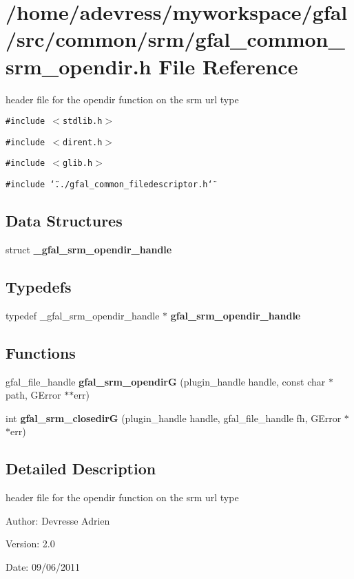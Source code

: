 \section{/home/adevress/myworkspace/gfal/src/common/srm/gfal\_\-common\_\-srm\_\-opendir.h File Reference}
\label{gfal__common__srm__opendir_8h}
header file for the opendir function on the srm url type 

{\tt \#include $<$stdlib.h$>$}\par
{\tt \#include $<$dirent.h$>$}\par
{\tt \#include $<$glib.h$>$}\par
{\tt \#include \char`\"{}../gfal\_\-common\_\-filedescriptor.h\char`\"{}}\par
\subsection*{Data Structures}
\begin{CompactItemize}
\item 
struct \textbf{\_\-gfal\_\-srm\_\-opendir\_\-handle}
\end{CompactItemize}
\subsection*{Typedefs}
\begin{CompactItemize}
\item 
typedef \_\-gfal\_\-srm\_\-opendir\_\-handle $\ast$ \textbf{gfal\_\-srm\_\-opendir\_\-handle}\label{gfal__common__srm__opendir_8h_824f5b93bbf97b9fed247ce0d6603a2c}

\end{CompactItemize}
\subsection*{Functions}
\begin{CompactItemize}
\item 
gfal\_\-file\_\-handle \textbf{gfal\_\-srm\_\-opendir\-G} (plugin\_\-handle handle, const char $\ast$path, GError $\ast$$\ast$err)\label{gfal__common__srm__opendir_8h_fd69e8b21a559da40247ce7e0b8a2cf7}

\item 
int \textbf{gfal\_\-srm\_\-closedir\-G} (plugin\_\-handle handle, gfal\_\-file\_\-handle fh, GError $\ast$$\ast$err)\label{gfal__common__srm__opendir_8h_a110ca5125e7c1ee1d21c8d8451060a9}

\end{CompactItemize}


\subsection{Detailed Description}
header file for the opendir function on the srm url type 

\begin{Desc}
\item[Author:]Devresse Adrien \end{Desc}
\begin{Desc}
\item[Version:]2.0 \end{Desc}
\begin{Desc}
\item[Date:]09/06/2011 \end{Desc}
